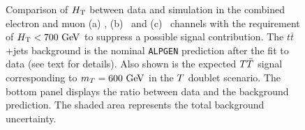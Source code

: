 \begin{figure}[h!tb]\begin{center}
	\caption{Comparison of $\HT$ between data and simulation in the combined
electron and muon (a) \chii, (b) \chiii\ and (c) \chiv\ channels with 
the requirement of $\HT<700\gev$ to suppress a possible signal contribution.
The $t\bar{t}$+jets background is the nominal \texttt{ALPGEN} prediction after the fit to data (see text for details).
Also shown is the expected $\TT$ signal corresponding to $m_{\T}=600\gev$ in the $\T$ doublet scenario.
The bottom panel displays the ratio between data
and the background prediction. The shaded area represents the total background uncertainty.\label{fig:HT_afterfit}}
\end{center}\end{figure}

